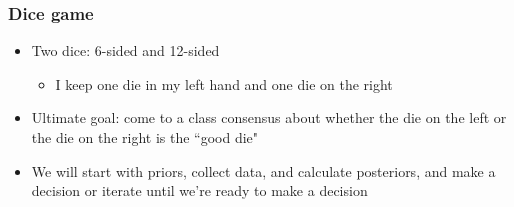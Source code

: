 \documentclass[slidestop,compress,mathserif,12pt,t,professionalfonts,xcolor=table]{beamer}
\begin{document}
\begin{frame}
\frametitle{Dice game}

\begin{itemize}

\item Two dice: 6-sided and 12-sided
\begin{itemize}
\item I keep one die in my left hand and one die on the right
\end{itemize}

\pause

\item Ultimate goal: come to a class consensus about whether the die on the left or the die on the right is the ``good die"

\pause

\item We will start with priors, collect data, and calculate posteriors, and make a decision or iterate until we're ready to make a decision

\end{itemize}


\end{frame}

\end{document}
